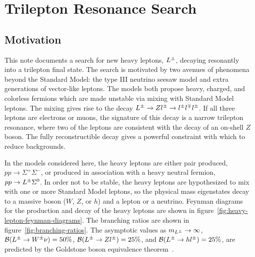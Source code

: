 \chapter{Trilepton Resonance Search}\label{ch:trilepton-resonance-search}

\section{Motivation}
This note documents a search for new heavy leptons, $L^{\pm}$, decaying resonantly into a trilepton final state. The search is motivated by two avenues of phenomena beyond the Standard Model: the type III neutrino seesaw model and extra generations of vector-like leptons. The models both propose heavy, charged, and colorless fermions which are made unstable via mixing with Standard Model leptons. The mixing gives rise to the decay $L^{\pm}\rightarrow Zl^{\pm} \rightarrow l^{\pm} l^{\mp} l^{\pm}$. If all three leptons are electrons or muons, the signature of this decay is a narrow trilepton resonance, where two of the leptons are consistent with the decay of an on-shell $Z$ boson. The fully reconstructible decay gives a powerful constraint with which to reduce backgrounds. 

In the models considered here, the heavy leptons are either pair produced, $pp\rightarrow \Sigma^+\Sigma^-$, or produced in association with a heavy neutral fermion, $pp\rightarrow L^{\pm}\Sigma^0$. In order not to be stable, the heavy leptons are hypothesized to mix with one or more Standard Model leptons, so the physical mass eigenstates decay to a massive boson ($W$, $Z$, or $h$) and a lepton or a neutrino. Feynman diagrams for the production and decay of the heavy leptons are shown in figure~\ref{fig:heavy-lepton-feynman-diagrams}. The branching ratios are shown in figure~\ref{fig:branching-ratios}. The asymptotic values as $m_{L^{\pm}}\rightarrow \infty$, $\mathcal{B}(L^{\pm}\rightarrow W^{\pm}\nu)=50\%$, $\mathcal{B}(L^{\pm}\rightarrow Zl^{\pm})=25\%$, and $\mathcal{B}(L^{\pm}\rightarrow hl^{\pm})=25\%$, are predicted by the Goldstone boson equivalence theorem~\cite{Chanowitz1985379}. 

